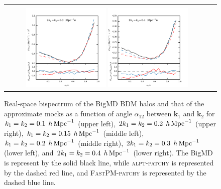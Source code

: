 \begin{figure}
\begin{tabular}{cc}
\vspace{-0.8cm}
\\
\includegraphics[width=0.4\textwidth]{figures/mocks/bispec4.pdf}
\includegraphics[width=0.4\textwidth]{figures/mocks/bispec6.pdf}
\vspace{-0.25cm}
\end{tabular}
\caption{\label{fig:bispec} Real-space bispectrum of the BigMD BDM halos and that of the approximate mocks as a function of angle $\alpha_{12}$ between $\mathbf{k}_1$ and $\mathbf{k}_{2}$ for $k_{1}=k_{2}=0.1\; \,h\,{\rm Mpc}^{-1}$ (upper left), $2k_{1}=k_{2}=0.2\; \,h\,{\rm Mpc}^{-1}$ (upper right), $k_{1}=k_{2}=0.15\; \,h\,{\rm Mpc}^{-1}$ (middle left), $k_{1}=k_{2}=0.2\; \,h\,{\rm Mpc}^{-1}$ (middle right), $2k_{1}=k_{2}=0.3\; \,h\,{\rm Mpc}^{-1}$ (lower left), and $2k_{1}=k_{2}=0.4\; \,h\,{\rm Mpc}^{-1}$ (lower right). The BigMD is represent by the solid black line, while \textsc{alpt}-\textsc{patchy} is represented by the dashed red line, and \textsc{FastPM}-\textsc{patchy} is represented by the dashed blue line.}
\end{figure}

